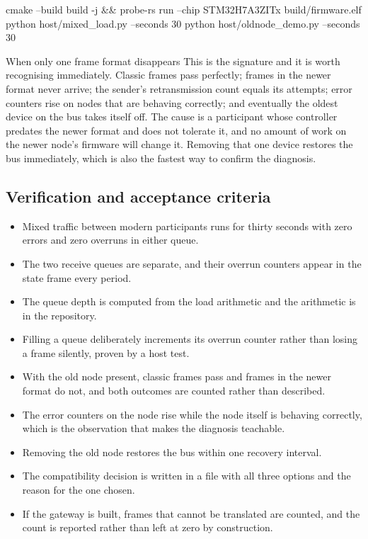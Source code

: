 \begin{shellcode}
cmake --build build -j && probe-rs run --chip STM32H7A3ZITx build/firmware.elf
python host/mixed_load.py --seconds 30
python host/oldnode_demo.py --seconds 30
\end{shellcode}

\begin{note}{When only one frame format disappears}
This is the signature and it is worth recognising immediately. Classic frames
pass perfectly; frames in the newer format never arrive; the sender's
retransmission count equals its attempts; error counters rise on nodes that are
behaving correctly; and eventually the oldest device on the bus takes itself
off. The cause is a participant whose controller predates the newer format and
does not tolerate it, and no amount of work on the newer node's firmware will
change it. Removing that one device restores the bus immediately, which is also
the fastest way to confirm the diagnosis.
\end{note}

\subsection*{Verification and acceptance criteria}

\begin{itemize}
\item Mixed traffic between modern participants runs for thirty seconds with
zero errors and zero overruns in either queue.
\item The two receive queues are separate, and their overrun counters appear in
the state frame every period.
\item The queue depth is computed from the load arithmetic and the arithmetic is
in the repository.
\item Filling a queue deliberately increments its overrun counter rather than
losing a frame silently, proven by a host test.
\item With the old node present, classic frames pass and frames in the newer
format do not, and both outcomes are counted rather than described.
\item The error counters on the node rise while the node itself is behaving
correctly, which is the observation that makes the diagnosis teachable.
\item Removing the old node restores the bus within one recovery interval.
\item The compatibility decision is written in a file with all three options and
the reason for the one chosen.
\item If the gateway is built, frames that cannot be translated are counted, and
the count is reported rather than left at zero by construction.
\end{itemize}

